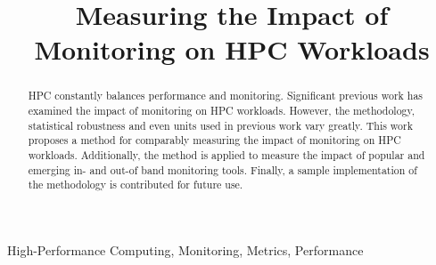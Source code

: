 \documentclass[conference]{IEEEtran}
\begin{document}


\title{Measuring the Impact of Monitoring on HPC Workloads}

\author{
\and
{}

\and
{}

\and
{}
}

\maketitle

\begin{abstract}
HPC constantly balances performance and monitoring. Significant previous work 
has examined the impact of monitoring on HPC workloads. However, the 
methodology, statistical robustness and even units used in previous work vary 
greatly. This work proposes a method for comparably measuring the impact of 
monitoring on HPC workloads. Additionally, the method is applied to measure 
the impact of popular and emerging in- and out-of band monitoring tools. 
Finally, a sample implementation of the methodology is contributed for future 
use.
\end{abstract}

\begin{IEEEkeywords}
High-Performance Computing, Monitoring, Metrics, Performance
\end{IEEEkeywords}
\end{document}
